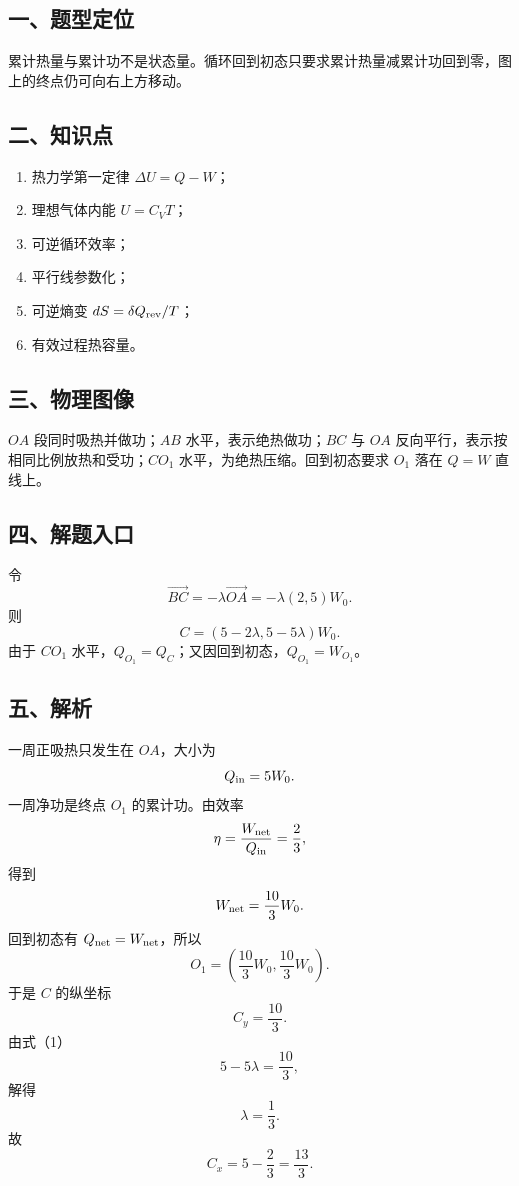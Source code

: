 \documentclass[12pt,a4paper,UTF8]{ctexart}
\newcommand{\tightlist}{\setlength{\itemsep}{0pt}\setlength{\parskip}{0pt}}
\begin{document}
\subsection{一、题型定位}\label{ux4e00ux9898ux578bux5b9aux4f4d-5}

累计热量与累计功不是状态量。循环回到初态只要求累计热量减累计功回到零，图上的终点仍可向右上方移动。

\subsection{二、知识点}\label{ux4e8cux77e5ux8bc6ux70b9-5}

\begin{enumerate}
\def\labelenumi{\arabic{enumi}.}
\tightlist
\item
  热力学第一定律 \(\Delta U=Q-W\)；
\item
  理想气体内能 \(U=C_VT\)；
\item
  可逆循环效率；
\item
  平行线参数化；
\item
  可逆熵变 \(dS=\delta Q_{\rm rev}/T\)；
\item
  有效过程热容量。
\end{enumerate}

\subsection{三、物理图像}\label{ux4e09ux7269ux7406ux56feux50cf-5}

\(OA\) 段同时吸热并做功；\(AB\) 水平，表示绝热做功；\(BC\) 与 \(OA\)
反向平行，表示按相同比例放热和受功；\(CO_1\)
水平，为绝热压缩。回到初态要求 \(O_1\) 落在 \(Q=W\) 直线上。

\subsection{四、解题入口}\label{ux56dbux89e3ux9898ux5165ux53e3-5}

令 \[
\overrightarrow{BC}=-\lambda\overrightarrow{OA}
=-\lambda(2,5)W_0.
\] 则 \[
C=(5-2\lambda,5-5\lambda)W_0. \tag{1}
\] 由于 \(CO_1\)
水平，\(Q_{O_1}=Q_C\)；又因回到初态，\(Q_{O_1}=W_{O_1}\)。

\subsection{五、解析}\label{ux4e94ux89e3ux6790-5}

一周正吸热只发生在 \(OA\)，大小为 \[
Q_{\rm in}=5W_0.
\] 一周净功是终点 \(O_1\) 的累计功。由效率 \[
\eta=\frac{W_{\rm net}}{Q_{\rm in}}=\frac23,
\] 得到 \[
W_{\rm net}=\frac{10}{3}W_0.
\] 回到初态有 \(Q_{\rm net}=W_{\rm net}\)，所以 \[
O_1=\left(\frac{10}{3}W_0,\frac{10}{3}W_0\right). \tag{2}
\] 于是 \(C\) 的纵坐标 \[
\boxed{C_y=\frac{10}{3}}. \tag{3}
\] 由式（1） \[
5-5\lambda=\frac{10}{3},
\] 解得 \[
\lambda=\frac13.
\] 故 \[
\boxed{
C_x=5-\frac23=\frac{13}{3}
}. \tag{4}
\]
\end{document}
